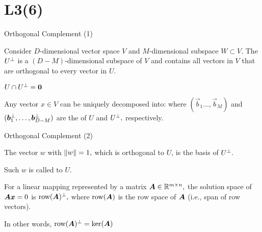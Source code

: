 \documentclass[fleqn,aspectratio=169]{beamer}
\begin{document}
\section{L3(6)}
\begin{frame}{Orthogonal Complement (1)}

\plitemsep 0.1in

\bci 

\item Consider $D$-dimensional vector space $V$ and $M$-dimensional subspace  $W \subset V.$ The  $U^{\bot}$ is a $(D-M)$-dimensional subspace of $V$ and contains all vectors in $V$ that are orthogonal to every vector in $U.$

\item $U \cap U^{\bot} = \bm{0}$

\item Any vector $x \in V$ can be uniquely decomposed into:
where $(\vec{b}_1 \ldots, \vec{b}_M)$ and $(\bm{b}^{\bot}_1, \ldots, \bm{b}^{\bot}_{D-M} )$ are the  of $U$ and $U^{\bot},$ respectively. 
\eci
\end{frame}

\begin{frame}{Orthogonal Complement (2)}

\plitemsep 0.1in

\vspace{-0.3cm}
\begin{center}
\end{center}
\vspace{-0.5cm}
\bci 
\item The vector $w$ with $\left \lVert w \right \rVert=1,$ which is orthogonal to $U$, is the basis of $U^{\bot}.$
\item Such $w$ is called  to $U.$

\item For a linear mapping represented by a matrix $\bm{A} \in {\mathbb R}^{m \times n},$ the solution space of $\bm{A} \bm{x} =0$ is $\text{row}(\bm{A})^{\bot},$ where $\text{row}(\bm{A})$ is the row space of $\bm{A}$ (i.e., span of row vectors).

In other words, $\text{row}(\bm{A})^{\bot} = \ker(\bm{A})$
\eci


\end{frame}
\end{document}
